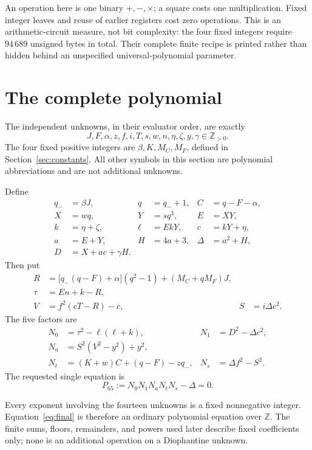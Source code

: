\documentclass[11pt,letterpaper]{article}
\theoremstyle{definition}
\newcommand{\Z}{\mathbb Z}
\newcommand{\Zp}{\mathbb Z_{>0}}
\begin{document}
An operation here is one binary \(+,-,\times\); a square costs one
multiplication. Fixed integer leaves and reuse of earlier registers cost
zero operations. This is an arithmetic-circuit measure, not bit complexity:
the four fixed integers require \(94\,689\) unsigned bytes in total.
Their complete finite recipe is printed rather than hidden behind an
unspecified universal-polynomial parameter.

\section{The complete polynomial}\label{sec:equation}

The independent unknowns, in their evaluator order, are exactly
\[
 \boxed{J,F,\alpha,z,f,i,T,s,w,n,\eta,\zeta,y,\gamma\in\Zp.}
\]
The four fixed positive integers are \(\beta,K,M_C,M_F\), defined in
Section~\ref{sec:constants}. All other symbols in this section are
polynomial abbreviations and are not additional unknowns.

Define
\begin{align}
 q_-&=\beta J,& q&=q_-+1,& C&=q-F-\alpha,\label{eq:q}\\
 X&=wq,&Y&=sq^3,&E&=XY,\label{eq:XY}\\
 k&=\eta+\zeta,&\ell&=EkY,&c&=kY+\eta,\label{eq:k}\\
 a&=E+Y,& H&=4a+3,&\Delta&=a^2+H,\label{eq:delta}\\
 D&=X+ac+\gamma H.&&&&\label{eq:D}
\end{align}
Then put
\begin{align}
 R&=\bigl[q_-(q-F)+\alpha\bigr](q^2-1)+(M_C+qM_F)J,\label{eq:R}\\
 \tau&=En+k-R,\label{eq:carrier}\\
 V&=f^2(cT-R)-c,& S&=i\Delta c^2.\label{eq:VS}
\end{align}
The five factors are
\begin{align}
 N_0&=\tau^2-\ell(\ell+k),&
 N_1&=D^2-\Delta c^2,\label{eq:norms}\\
 N_a&=S^2(V^2-y^2)+y^2,\label{eq:aux}\\
 N_t&=(K+w)C+(q-F)-zq_-,&
 N_s&=\Delta f^2-S^2.\label{eq:transport}
\end{align}
The requested single equation is
\begin{equation}\label{eq:final}
 \boxed{P_{65}:=N_0N_1N_aN_tN_s-\Delta=0.}
\end{equation}

Every exponent involving the fourteen unknowns is a fixed nonnegative
integer. Equation~\eqref{eq:final} is therefore an ordinary polynomial
equation over \(\Z\). The finite sums, floors, remainders, and powers used
later describe fixed coefficients only; none is an additional operation
on a Diophantine unknown.
\end{document}
